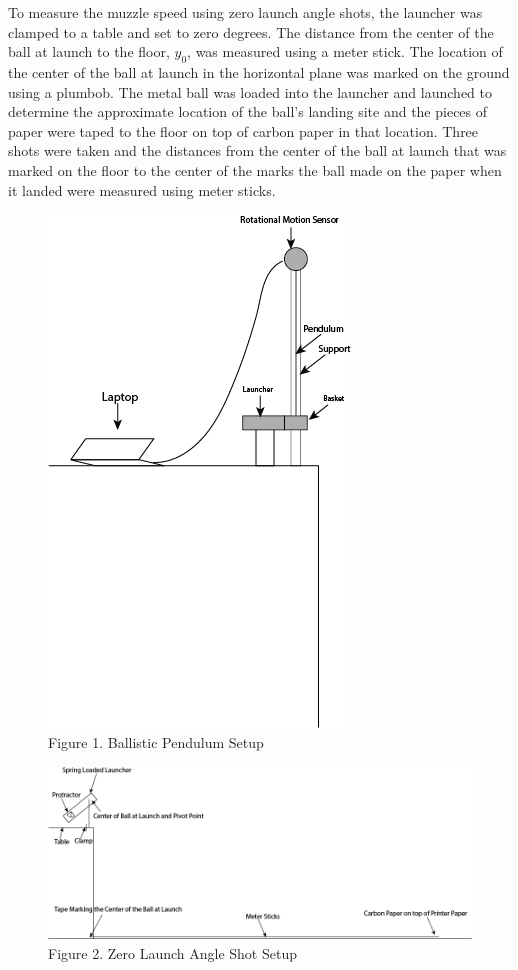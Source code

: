 \documentclass[12pt]{article}
\begin{document}
        To measure the muzzle speed using zero launch angle shots, the launcher was clamped to a table and set to zero degrees. The distance from the center of the ball at launch to the floor, \(y_0\), was measured using a meter stick. The location of the center of the ball at launch in the horizontal plane was marked on the ground using a plumbob. The metal ball was loaded into the launcher and launched to determine the approximate location of the ball's landing site and the pieces of paper were taped to the floor on top of carbon paper in that location. Three shots were taken and the distances from the center of the ball at launch that was marked on the floor to the center of the marks the ball made on the paper when it landed were measured using meter sticks. 
        \begin{figure}[H]
            \centering
            \includegraphics[height=0.85\textheight]{Pendulum Setup.png}
            \caption{Figure 1. Ballistic Pendulum Setup}
        \end{figure}
        \begin{figure}[H]
            \centering
            \includegraphics[width=\textwidth]{zla setup.png}
            \caption{Figure 2. Zero Launch Angle Shot Setup}
        \end{figure}
\end{document}
